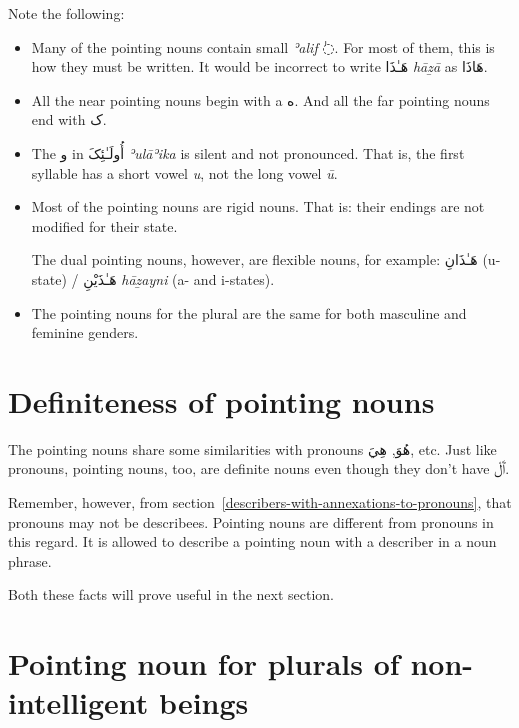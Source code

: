 \documentclass[
  10pt,
]{book}
\begin{document}
Note the following:

\begin{itemize}
\item
  Many of the pointing nouns contain small \emph{ʾalif} \foreignlanguage{arabic}{◌ٰ}. For most of them, this is how they must be written. It would be incorrect to write \foreignlanguage{arabic}{هَـٰذَا} \emph{hāẕā} as \foreignlanguage{arabic}{هَاذَا}.
\item
  All the near pointing nouns begin with a \foreignlanguage{arabic}{ه}. And all the far pointing nouns end with \foreignlanguage{arabic}{ک}.
\item
  The \foreignlanguage{arabic}{و} in \foreignlanguage{arabic}{أُولَـٰئِکَ} \emph{ʾulāʾika} is silent and not pronounced. That is, the first syllable has a short vowel \emph{u}, not the long vowel \emph{ū}.
\item
  Most of the pointing nouns are rigid nouns. That is: their endings are not modified for their state.

  The dual pointing nouns, however, are flexible nouns, for example: \foreignlanguage{arabic}{هَـٰذَانِ} (u-state) / \foreignlanguage{arabic}{هَـٰذَيْنِ} \emph{hāẕayni} (a- and i-states).
\item
  The pointing nouns for the plural are the same for both masculine and feminine genders.
\end{itemize}

\section{Definiteness of pointing nouns}\label{definiteness-of-pointing-nouns}

The pointing nouns share some similarities with pronouns \foreignlanguage{arabic}{هُوَ}, \foreignlanguage{arabic}{هِيَ}, etc. Just like pronouns, pointing nouns, too, are definite nouns even though they don't have \foreignlanguage{arabic}{ٱَلْ}.

Remember, however, from section~\ref{describers-with-annexations-to-pronouns}, that pronouns may not be describees.
Pointing nouns are different from pronouns in this regard. It is allowed to describe a pointing noun with a describer in a noun phrase.

Both these facts will prove useful in the next section.

\section{Pointing noun for plurals of non-intelligent beings}\label{pointing-noun-for-plurals-of-non-intelligent-beings}
\end{document}
